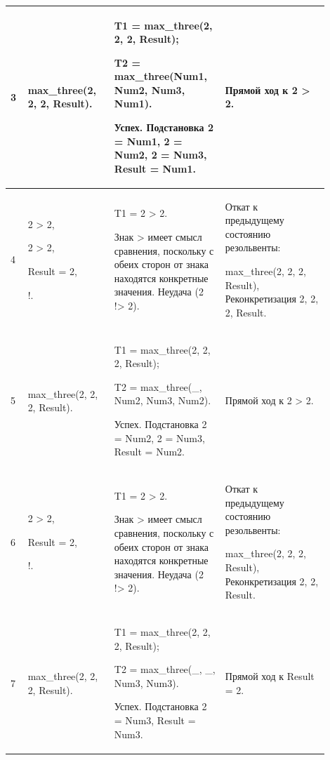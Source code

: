 \documentclass[a4paper,12pt]{article}
\begin{document}
\begin{center}
\begin{longtable}[h!]{|p{0.05\linewidth}|p{0.25\linewidth}|p{ 0.3\linewidth}|p{ 0.3\linewidth}|}
			\hline
			
			{3} & {max\_three(2, 2, 2, Result).} & {T1 = max\_three(2, 2, 2, Result);
				
				
				
				T2 = max\_three(Num1, Num2, Num3, Num1).
				
				
				
				Успех. Подстановка 2 = Num1, 2 = Num2, 2 = Num3, Result = Num1.} & {Прямой ход к 2 > 2.}\\
			
			\hline
			
			{4} & {2 > 2,
				
				
				
				2 > 2,
				
				
				
				Result = 2,
				
				!.} & {T1 = 2 > 2.
				
				Знак > имеет смысл сравнения, поскольку с обеих сторон от знака находятся конкретные значения. Неудача (2 !> 2).} & {Откат к предыдущему состоянию резольвенты: 
				
				max\_three(2, 2, 2, Result), Реконкретизация 2, 2, 2, Result.}\\
			\hline
			{5} & {max\_three(2, 2, 2, Result).} & {T1 = max\_three(2, 2, 2, Result);
				
				T2 = max\_three(\_, Num2, Num3, Num2).
				
				Успех. Подстановка 2 = Num2, 2 = Num3, Result = Num2.} & {Прямой ход к 2 > 2.}\\
			\hline
			{6} & {2 > 2,
				
				Result = 2,
				
				!.} & {T1 = 2 > 2.
				
				Знак > имеет смысл сравнения, поскольку с обеих сторон от знака находятся конкретные значения. Неудача (2 !> 2).} & {Откат к предыдущему состоянию резольвенты: 
				
				max\_three(2, 2, 2, Result), Реконкретизация 2, 2, Result.}\\
			
			\hline
			
			{7} & {max\_three(2, 2, 2, Result).} & {T1 = max\_three(2, 2, 2, Result);
				
				
				
				T2 = max\_three(\_, \_, Num3, Num3).
				
				
				
				Успех. Подстановка 2 = Num3, Result = Num3.} & {Прямой ход к Result = 2.}\\
			

\end{longtable}
\end{center}
\end{document}
